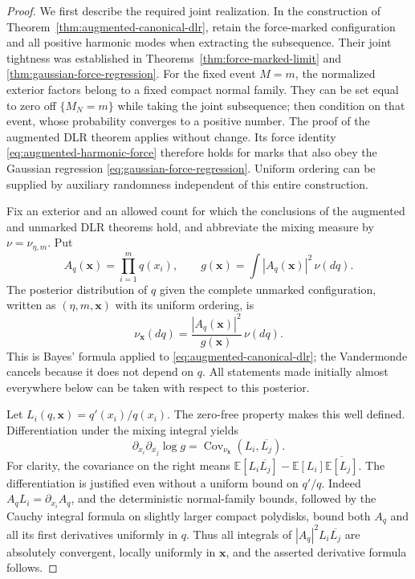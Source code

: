 \documentclass[11pt,a4paper]{article}
\numberwithin{equation}{section}
\theoremstyle{definition}
\theoremstyle{remark}
\begin{document}
\begin{proof}
We first describe the required joint realization. In the construction
of Theorem~\ref{thm:augmented-canonical-dlr}, retain the force-marked
configuration and all positive harmonic modes when extracting the
subsequence. Their joint tightness was established in
Theorems~\ref{thm:force-marked-limit} and
\ref{thm:gaussian-force-regression}. For the fixed event $M=m$, the
normalized exterior factors belong to a fixed compact normal family.
They can be set equal to zero off $\{M_N=m\}$ while taking the joint
subsequence; then condition on that event, whose probability converges
to a positive number. The proof of the augmented DLR theorem applies
without change. Its force identity
\eqref{eq:augmented-harmonic-force} therefore holds for marks that
also obey the Gaussian regression
\eqref{eq:gaussian-force-regression}. Uniform ordering can be supplied
by auxiliary randomness independent of this entire construction.

Fix an exterior and an allowed count for which the conclusions of
the augmented and unmarked DLR theorems hold, and abbreviate the
mixing measure by $\nu=\nu_{\eta,m}$. Put
\[
 A_q(\mathbf x)=\prod_{i=1}^m q(x_i),\qquad
 g(\mathbf x)=\int |A_q(\mathbf x)|^2\,\nu(dq).
\]
The posterior distribution of $q$ given the complete unmarked
configuration, written as $(\eta,m,\mathbf x)$ with its uniform
ordering, is
\begin{equation}\label{eq:conditional-q-posterior}
 \nu_{\mathbf x}(dq)=\frac{|A_q(\mathbf x)|^2}{g(\mathbf x)}\,\nu(dq).
\end{equation}
This is Bayes' formula applied to
\eqref{eq:augmented-canonical-dlr}; the Vandermonde cancels because
it does not depend on $q$. All statements made initially almost
everywhere below can be taken with respect to this posterior.

Let $L_i(q,\mathbf x)=q'(x_i)/q(x_i)$. The zero-free property makes
this well defined. Differentiation under the mixing integral yields
\begin{equation}\label{eq:conditional-levi-as-covariance}
 \partial_{x_i}\partial_{\overline{x_j}}\log g
  =\operatorname{Cov}_{\nu_{\mathbf x}}
                          (L_i,\overline{L_j}).
\end{equation}
For clarity, the covariance on the right means
$\mathbb E[L_i\overline{L_j}]-\mathbb E[L_i]\overline{\mathbb E[L_j]}$.
The differentiation is justified even without a uniform bound on
$q'/q$. Indeed $A_qL_i=\partial_{x_i}A_q$, and the deterministic
normal-family bounds, followed by the Cauchy integral formula on
slightly larger compact polydisks, bound both $A_q$ and all its
first derivatives uniformly in $q$. Thus all integrals of
$|A_q|^2L_i\overline{L_j}$ are absolutely convergent, locally uniformly
in $\mathbf x$, and the asserted derivative formula follows.


\end{proof}
\end{document}
